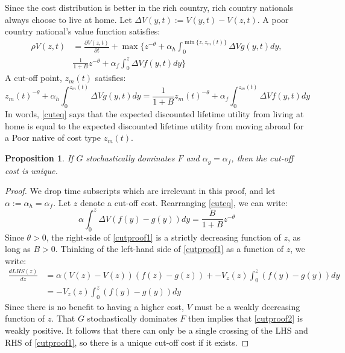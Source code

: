 \documentclass[12pt]{article}
\newtheorem{proposition}[theorem]{Proposition}
\begin{document}
Since the cost distribution is better in the rich country, rich country nationals always choose to live at home.
Let $\Delta V(y,t) := V(y,t)-V(z,t)$.
A poor country national's value function satisfies:
\begin{align}
  \label{valfun}
  \rho V(z,t) &= \frac{\partial V(z,t)}{\partial t} + \max\Bigg\{z^{-\theta} +  \alpha_h \int_0^{\min \{z,z_m(t)\}} \Delta V g(y,t) dy, \nonumber  \\
  & \frac{1}{1+B} z^{-\theta}+ \alpha_f \int_0^z \Delta V f(y,t) dy \Bigg\}
\end{align}
A cut-off point, $z_m(t)$ satisfies:
\begin{equation}
  \label{cuteq}
  z_m(t)^{-\theta} + \alpha_h \int_0^{z_m(t)} \Delta V g(y,t) dy = \frac{1}{1+B} z_m(t)^{-\theta} + \alpha_f \int_0^{z_m(t)} \Delta V f(y,t)dy
\end{equation}
In words, \eqref{cuteq} says that the expected discounted lifetime utility from living at home is equal to the expected discounted lifetime utility from moving abroad for a Poor native of cost type $z_m(t)$.
\begin{proposition}
  \label{uniqcut}
 If $G$ stochastically dominates $F$ and $\alpha_g = \alpha_f$, then the cut-off cost is unique. 
\end{proposition}
\begin{proof}
  We drop time subscripts which are irrelevant in this proof, and let $\alpha := \alpha_h = \alpha_f$.
  Let $z$ denote a cut-off cost.
  Rearranging \eqref{cuteq}, we can write:
  \begin{equation}
    \label{cutproof1}
    \alpha \int_0^{z} \Delta V \left(f(y)-g(y)\right)dy = \frac{B}{1+B}z^{-\theta}
  \end{equation}
  Since $\theta > 0$, the right-side of \eqref{cutproof1} is a strictly decreasing function of $z$, as long as $B>0$.  
  Thinking of the left-hand side of \eqref{cutproof1} as a function of $z$, we write:
  \begin{align}
    \label{cutproof2}
    \frac{d LHS(z)}{d z} &= \alpha \left(V(z)-V(z)\right)\left(f(z)-g(z)\right) + -V_z(z) \int_0^z \left(f(y)-g(y)\right) dy \nonumber \\
    &= -V_z(z) \int_0^z \left(f(y)-g(y)\right) dy
  \end{align}
  Since there is no benefit to having a higher cost, $V$ must be a weakly decreasing function of $z$.  That $G$ stochastically dominates $F$ then implies that \eqref{cutproof2} is weakly positive.  It follows that there can only be a single crossing of the LHS and RHS of \eqref{cutproof1}, so there is a unique cut-off cost if it exists.
\end{proof}
\end{document}
